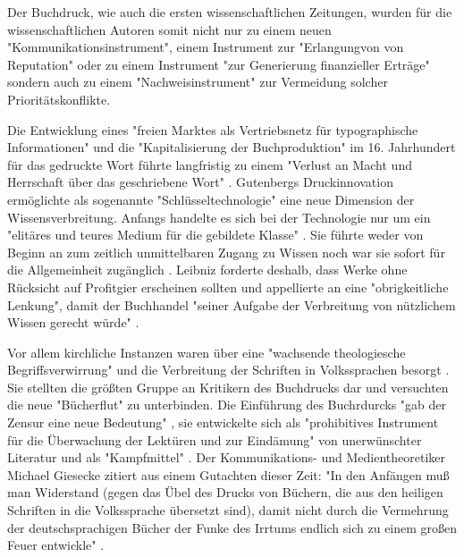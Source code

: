 Der Buchdruck, wie auch die ersten wissenschaftlichen Zeitungen, wurden für die wissenschaftlichen Autoren somit nicht nur zu einem neuen "Kommunikationsinstrument", einem Instrument zur "Erlangungvon von Reputation" oder zu einem Instrument "zur Generierung finanzieller Erträge" sondern auch zu einem "Nachweisinstrument" \cite{wunderlich_2008_buchdruck} \cite{schirmbacher_2009_wisspub} zur Vermeidung solcher Prioritätskonflikte.

Die Entwicklung eines "freien Marktes als Vertriebsnetz für typographische Informationen"\cite{giesecke_1991_buchdruck} und die "Kapitalisierung der Buchproduktion" \cite{steiner_1998_autorenhonorar} im 16. Jahrhundert für das gedruckte Wort führte langfristig zu einem "Verlust an Macht und Herrschaft über das geschriebene Wort" \cite{wunderlich_2008_buchdruck}. Gutenbergs Druckinnovation ermöglichte als sogenannte "Schlüsseltechnologie" \cite{jager_1993_theoretische} eine neue Dimension der Wissensverbreitung. Anfangs handelte es sich bei der Technologie nur um ein "elitäres und teures Medium für die gebildete Klasse" \cite{hartmann_2008_medien}. Sie führte weder von Beginn an zum zeitlich unmittelbaren Zugang zu Wissen noch war sie sofort  für die Allgemeinheit zugänglich \cite{hartmann_2008_medien}. Leibniz forderte deshalb, dass Werke ohne Rücksicht auf Profitgier erscheinen sollten und appellierte an eine "obrigkeitliche Lenkung", damit der Buchhandel "seiner Aufgabe der Verbreitung von nützlichem Wissen gerecht würde" \cite{wittmann_1999_geschichte}.

Vor allem kirchliche Instanzen waren über eine "wachsende theologiesche Begriffsverwirrung" und die Verbreitung der Schriften in Volkssprachen besorgt \cite{giesecke_1991_buchdruck}. Sie stellten die größten Gruppe an Kritikern des Buchdrucks dar und versuchten die neue "Bücherflut" zu unterbinden\cite{giesecke_1991_buchdruck}. Die Einführung des Buchrdurcks "gab der Zensur eine neue Bedeutung" \cite{sprachgeschichte_1998_besch}, sie entwickelte sich als "prohibitives Instrument für die Überwachung der Lektüren und zur Eindämung" von unerwünschter Literatur \cite{suchen} und als "Kampfmittel" \cite{sprachgeschichte_1998_besch}. Der Kommunikations- und Medientheoretiker Michael Giesecke zitiert aus einem Gutachten dieser Zeit: "In den Anfängen muß man Widerstand (gegen das Übel des Drucks von Büchern, die aus den heiligen Schriften in die Volkssprache übersetzt sind), damit nicht durch die Vermehrung der deutschsprachigen Bücher der Funke des Irrtums endlich sich zu einem großen Feuer entwickle" \cite{giesecke_1991_buchdruck}.

